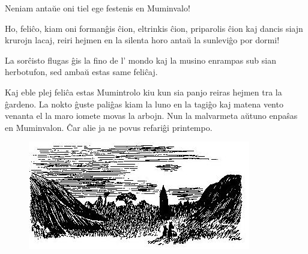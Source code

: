 Neniam antaŭe oni tiel ege festenis en Muminvalo!

Ho, feliĉo, kiam oni formanĝis ĉion, eltrinkis ĉion, priparolis ĉion kaj dancis siajn krurojn lacaj, reiri hejmen en la silenta horo antaŭ la sunleviĝo por dormi!

La sorĉisto flugas ĝis la fino de l' mondo kaj la musino enrampas sub sian herbotufon, sed ambaŭ estas same feliĉaj.

Kaj eble plej feliĉa estas Mumintrolo kiu kun sia panjo reiras hejmen tra la ĝardeno. La nokto ĝuste paliĝas kiam la luno en la tagiĝo kaj matena vento venanta el la maro iomete movas la arbojn. Nun la malvarmeta aŭtuno enpaŝas en Muminvalon. Ĉar alie ja ne povus refariĝi printempo.

\begin{figure}[htbp]
\centering
\includegraphics[keepaspectratio,width=\textwidth,height=0.75\textheight]{_38.jpg}
\caption{}
\label{_38}
\end{figure}



